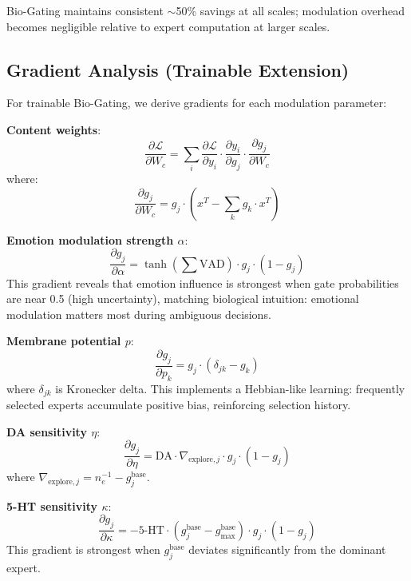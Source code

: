 \documentclass[preprint,12pt]{elsarticle}
\begin{document}
Bio-Gating maintains consistent $\sim$50\% savings at all scales; modulation overhead becomes negligible relative to expert computation at larger scales.

\subsection{Gradient Analysis (Trainable Extension)}

For trainable Bio-Gating, we derive gradients for each modulation parameter:

\textbf{Content weights}:
\begin{equation}
\frac{\partial \mathcal{L}}{\partial W_c} = \sum_i \frac{\partial \mathcal{L}}{\partial y_i} \cdot \frac{\partial y_i}{\partial g_j} \cdot \frac{\partial g_j}{\partial W_c}
\end{equation}
where:
\begin{equation}
\frac{\partial g_j}{\partial W_c} = g_j \cdot (x^T - \sum_k g_k \cdot x^T)
\end{equation}

\textbf{Emotion modulation strength $\alpha$}:
\begin{equation}
\frac{\partial g_j}{\partial \alpha} = \tanh(\sum \text{VAD}) \cdot g_j \cdot (1 - g_j)
\end{equation}
This gradient reveals that emotion influence is strongest when gate probabilities are near 0.5 (high uncertainty), matching biological intuition: emotional modulation matters most during ambiguous decisions.

\textbf{Membrane potential $p$}:
\begin{equation}
\frac{\partial g_j}{\partial p_k} = g_j \cdot (\delta_{jk} - g_k)
\end{equation}
where $\delta_{jk}$ is Kronecker delta. This implements a Hebbian-like learning: frequently selected experts accumulate positive bias, reinforcing selection history.

\textbf{DA sensitivity $\eta$}:
\begin{equation}
\frac{\partial g_j}{\partial \eta} = \text{DA} \cdot \nabla_{\text{explore},j} \cdot g_j \cdot (1 - g_j)
\end{equation}
where $\nabla_{\text{explore},j} = n_e^{-1} - g_j^{\text{base}}$.

\textbf{5-HT sensitivity $\kappa$}:
\begin{equation}
\frac{\partial g_j}{\partial \kappa} = -\text{5-HT} \cdot (g_j^{\text{base}} - g_{\max}^{\text{base}}) \cdot g_j \cdot (1 - g_j)
\end{equation}
This gradient is strongest when $g_j^{\text{base}}$ deviates significantly from the dominant expert.
\end{document}
